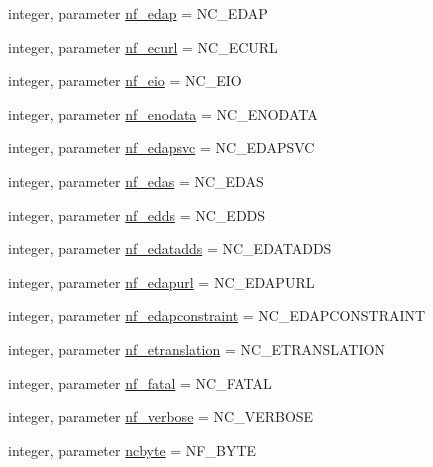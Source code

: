\begin{DoxyCompactItemize}
\item 
integer, parameter \hyperlink{namespacenetcdf__nf__data_a457a2431132da75ad9a0dbd161e864e8}{nf\+\_\+edap} = N\+C\+\_\+\+E\+D\+AP
\item 
integer, parameter \hyperlink{namespacenetcdf__nf__data_a5316537c3ed2e5b72696fab1ed502cfc}{nf\+\_\+ecurl} = N\+C\+\_\+\+E\+C\+U\+RL
\item 
integer, parameter \hyperlink{namespacenetcdf__nf__data_a9def0b3173a119099c1a6576bdbdb7da}{nf\+\_\+eio} = N\+C\+\_\+\+E\+IO
\item 
integer, parameter \hyperlink{namespacenetcdf__nf__data_a1c0065c6e07690631776621490e07f5f}{nf\+\_\+enodata} = N\+C\+\_\+\+E\+N\+O\+D\+A\+TA
\item 
integer, parameter \hyperlink{namespacenetcdf__nf__data_a7d19dcdde17507043c6078f7a1e3d2e8}{nf\+\_\+edapsvc} = N\+C\+\_\+\+E\+D\+A\+P\+S\+VC
\item 
integer, parameter \hyperlink{namespacenetcdf__nf__data_a6caa9dfbf83999c20a69beafb82c941c}{nf\+\_\+edas} = N\+C\+\_\+\+E\+D\+AS
\item 
integer, parameter \hyperlink{namespacenetcdf__nf__data_a2572d1be05fd530ae081c05d97f9f77c}{nf\+\_\+edds} = N\+C\+\_\+\+E\+D\+DS
\item 
integer, parameter \hyperlink{namespacenetcdf__nf__data_a79a56354e9b7c1c468dd56ca7e494a17}{nf\+\_\+edatadds} = N\+C\+\_\+\+E\+D\+A\+T\+A\+D\+DS
\item 
integer, parameter \hyperlink{namespacenetcdf__nf__data_a8f7e5d7283d0868d04f159d8662a3118}{nf\+\_\+edapurl} = N\+C\+\_\+\+E\+D\+A\+P\+U\+RL
\item 
integer, parameter \hyperlink{namespacenetcdf__nf__data_a1bab6ea4c1e0d0aa0d6726e4b45148a8}{nf\+\_\+edapconstraint} = N\+C\+\_\+\+E\+D\+A\+P\+C\+O\+N\+S\+T\+R\+A\+I\+NT
\item 
integer, parameter \hyperlink{namespacenetcdf__nf__data_ae5193f73e56230ac54049c56eaa0ef61}{nf\+\_\+etranslation} = N\+C\+\_\+\+E\+T\+R\+A\+N\+S\+L\+A\+T\+I\+ON
\item 
integer, parameter \hyperlink{namespacenetcdf__nf__data_ac9327edbd57889437ca36e4c7a37a94b}{nf\+\_\+fatal} = N\+C\+\_\+\+F\+A\+T\+AL
\item 
integer, parameter \hyperlink{namespacenetcdf__nf__data_ae025322805025e9a39302e4e1a5405e8}{nf\+\_\+verbose} = N\+C\+\_\+\+V\+E\+R\+B\+O\+SE
\item 
integer, parameter \hyperlink{namespacenetcdf__nf__data_ad9bf91b06b1fdc0e91ab484cb2839ea2}{ncbyte} = N\+F\+\_\+\+B\+Y\+TE
\item 

\end{DoxyCompactItemize}
